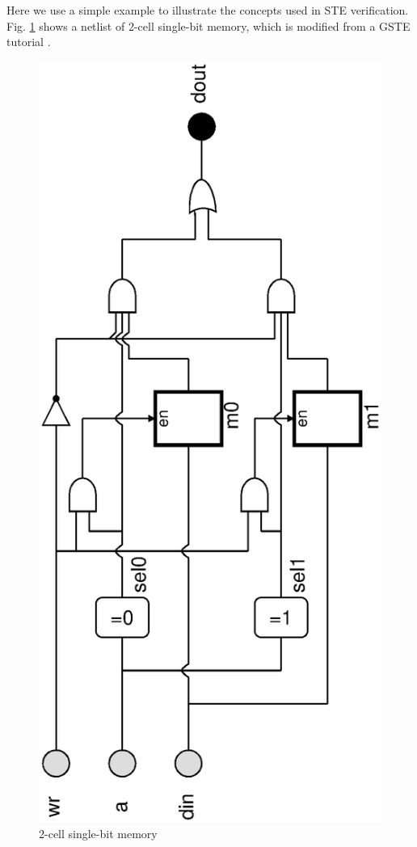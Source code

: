 \documentclass[final]{IEEEtran}
\begin{document}


 Here we use a simple example to illustrate the
 concepts used in STE verification. Fig. \ref{fig:memory} shows a
 netlist of 2-cell single-bit memory, which is modified from a GSTE
 tutorial \cite{DBLP:conf/atva/Yang06}.\\

 \begin{figure}[tbph]
 \begin{center}
 \includegraphics[angle=270, width=.4\textwidth]{memory.eps}
 \end{center}
 \caption{2-cell single-bit memory} \label{fig:memory}
 \end{figure}
\end{document}
